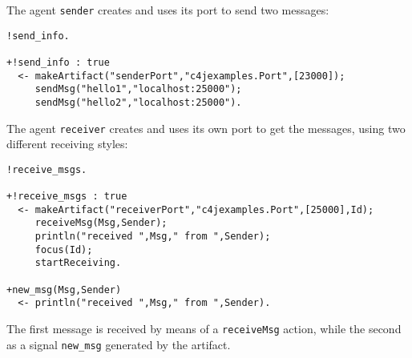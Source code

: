 \documentclass[11pt]{report}
\newcommand\code[1]{{\small{\mbox{\texttt{{#1}}}}}}
\begin{document}
\noindent The agent \code{sender} creates and uses its port to send two messages:
%
%
{\small{\begin{verbatim}
!send_info.

+!send_info : true
  <- makeArtifact("senderPort","c4jexamples.Port",[23000]);
     sendMsg("hello1","localhost:25000");
     sendMsg("hello2","localhost:25000"). 
\end{verbatim}}}

%
\noindent The agent \code{receiver} creates and uses its own port to get the messages, using two different receiving styles:
%
{\small{\begin{verbatim}
!receive_msgs.

+!receive_msgs : true
  <- makeArtifact("receiverPort","c4jexamples.Port",[25000],Id);
     receiveMsg(Msg,Sender);
     println("received ",Msg," from ",Sender);
     focus(Id);
     startReceiving.
     
+new_msg(Msg,Sender)
  <- println("received ",Msg," from ",Sender).
\end{verbatim}}}

\noindent The first message is received by means of a \code{receiveMsg} action, while the second as a signal  \code{new\_msg} generated by the artifact. 
\end{document}
